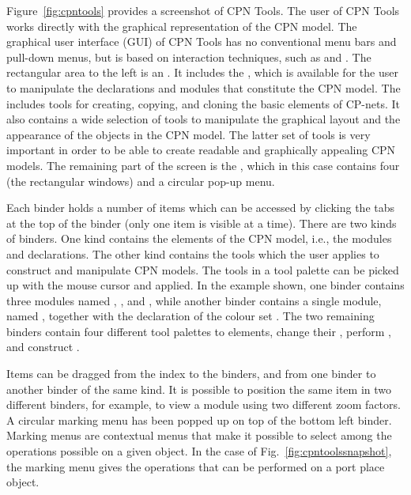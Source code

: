 Figure~\ref{fig:cpntools} provides a screenshot of CPN Tools. The user
of CPN Tools works directly with the graphical representation of the
CPN model. The graphical user interface (GUI) of CPN Tools has no
conventional menu bars and pull-down menus, but is based on
interaction techniques, such as  and
. The rectangular area to the left is an
. It includes the , which is
available for the user to manipulate the declarations and modules that
constitute the CPN model. The  includes tools for
creating, copying, and cloning the basic elements of CP-nets. It also
contains a wide selection of tools to manipulate the graphical layout
and the appearance of the objects in the CPN model. The latter set of
tools is very important in order to be able to create readable and
graphically appealing CPN models. The remaining part of the screen is
the , which in this case contains four
 (the rectangular windows) and a circular pop-up
menu.

Each binder holds a number of items which can be accessed by clicking
the tabs at the top of the binder (only one item is visible at a
time). There are two kinds of binders. One kind contains the elements
of the CPN model, i.e., the modules and declarations. The other kind
contains the tools which the user applies to construct and manipulate
CPN models. The tools in a tool palette can be picked up with the
mouse cursor and applied. In the example shown, one binder contains
three modules named , , and
, while another binder contains a single module,
named , together with the declaration of the colour
set . The two remaining binders contain four
different tool palettes to  elements, change their
, perform , and construct
.

Items can be dragged from the index to the binders, and from one
binder to another binder of the same kind. It is possible to position
the same item in two different binders, for example, to view a module
using two different zoom factors. A circular marking menu has been
popped up on top of the bottom left binder. Marking menus are
contextual menus that make it possible to select among the operations
possible on a given object. In the case of
Fig.~\ref{fig:cpntoolssnapshot}, the marking menu gives the operations
that can be performed on a port place object.

